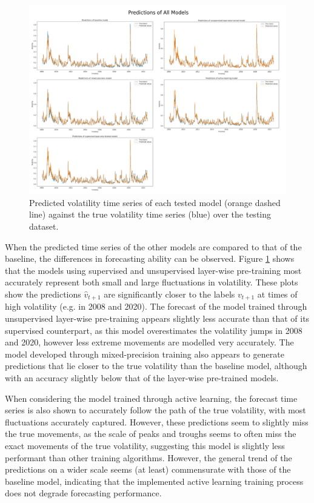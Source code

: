 \documentclass[a4paper, 11pt]{report}
\begin{document}
    \begin{figure}[ht]
        \centering
        \includegraphics[width=\textwidth]{results/all-predictions.png}
        \caption{\centering Predicted volatility time series of each tested model (orange dashed line) against the true volatility time series (blue) over the testing dataset.}
        \label{fig: predictions}
    \end{figure}

    When the predicted time series of the other models are compared to that of the baseline, the differences in forecasting ability can be observed. Figure \ref{fig: predictions} shows that the models using supervised and unsupervised layer-wise pre-training most accurately represent both small and large fluctuations in volatility. These plots show the predictions $\hat{v}_{t+1}$ are significantly closer to the labels $v_{t+1}$ at times of high volatility (e.g. in 2008 and 2020). The forecast of the model trained through unsupervised layer-wise pre-training appears slightly less accurate than that of its supervised counterpart, as this model overestimates the volatility jumps in 2008 and 2020, however less extreme movements are modelled very accurately. The model developed through mixed-precision training also appears to generate predictions that lie closer to the true volatility than the baseline model, although with an accuracy slightly below that of the layer-wise pre-trained models.

    When considering the model trained through active learning, the forecast time series is also shown to accurately follow the path of the true volatility, with most fluctuations accurately captured. However, these predictions seem to slightly miss the true movements, as the scale of peaks and troughs seems to often miss the exact movements of the true volatility, suggesting this model is slightly less performant than other training algorithms. However, the general trend of the predictions on a wider scale seems (at least) commensurate with those of the baseline model, indicating that the implemented active learning training process does not degrade forecasting performance.
\end{document}
